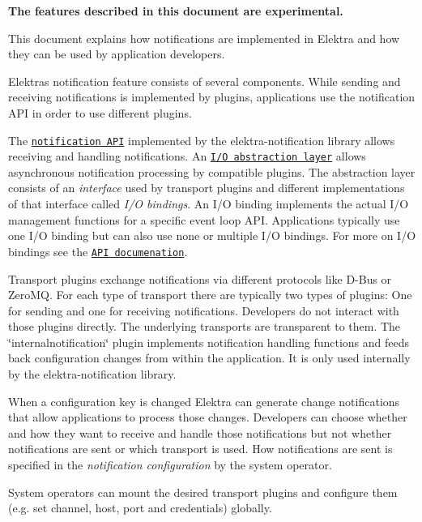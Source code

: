 {\bfseries The features described in this document are experimental.}

This document explains how notifications are implemented in Elektra and how they can be used by application developers.

Elektra\textquotesingle{}s notification feature consists of several components. While sending and receiving notifications is implemented by plugins, applications use the notification A\+PI in order to use different plugins.

The \href{https://doc.libelektra.org/api/latest/html/group__kdbnotification.html}{\tt notification A\+PI} implemented by the {\ttfamily elektra-\/notification} library allows receiving and handling notifications. An \href{https://doc.libelektra.org/api/latest/html/group__kdbio.html}{\tt I/O abstraction layer} allows asynchronous notification processing by compatible plugins. The abstraction layer consists of an {\itshape interface} used by transport plugins and different implementations of that interface called {\itshape I/O bindings}. An I/O binding implements the actual I/O management functions for a specific event loop A\+PI. Applications typically use one I/O binding but can also use none or multiple I/O bindings. For more on I/O bindings see the \href{https://doc.libelektra.org/api/latest/html/group__kdbio.html}{\tt A\+PI documenation}.

Transport plugins exchange notifications via different protocols like D-\/\+Bus or Zero\+MQ. For each type of transport there are typically two types of plugins\+: One for sending and one for receiving notifications. Developers do not interact with those plugins directly. The underlying transports are transparent to them. The \char`\"{}internalnotification\char`\"{} plugin implements notification handling functions and feeds back configuration changes from within the application. It is only used internally by the {\ttfamily elektra-\/notification} library.



When a configuration key is changed Elektra can generate change notifications that allow applications to process those changes. Developers can choose whether and how they want to receive and handle those notifications but not whether notifications are sent or which transport is used. How notifications are sent is specified in the {\itshape notification configuration} by the system operator.

System operators can mount the desired transport plugins and configure them (e.\+g. set channel, host, port and credentials) globally.

